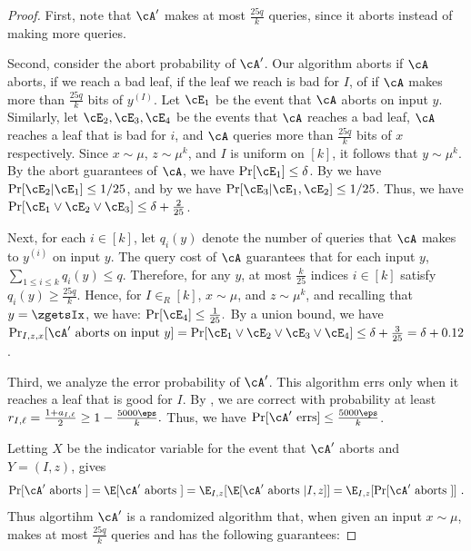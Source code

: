 \documentclass{toc}
\begin{document}
\begin{proof}
First, note that $\cA'$ makes at most $\frac{25q}{k}$ queries, since
it aborts instead of making more queries.

Second, consider the abort probability of $\cA'$.  Our algorithm
aborts if $\cA$ aborts, if we reach a bad leaf, if the leaf we reach
is bad for $I$, of if $\cA$ makes more than $\frac{25q}{k}$ bits of
$y^{(I)}$.  Let $\cE_1$ be the event that $\cA$ aborts on input $y$.
Similarly, let $\cE_2,\cE_3,\cE_4$ be the events that $\cA$ reaches a
bad leaf, $\cA$ reaches a leaf that is bad for $i$, and $\cA$ queries
more than $\frac{25q}{k}$ bits of $x$ respectively.  Since
$x\sim \mu$, $z \sim \mu^k$, and $I$ is uniform on $[k]$, it follows
that $y\sim \mu^k$.  By the abort guarantees of $\cA$, we have
$\Pr[\cE_1] \leq \delta$.  By  we have
$\Pr[\cE_2 | \cE_1] \leq 1/25$, and by 
we have $\Pr[\cE_3 | \cE_1,\cE_2] \leq 1/25$.  Thus, we have
$\Pr[\cE_1\vee \cE_2 \vee \cE_3] \leq \delta +\frac{2}{25}$.


Next, for each $i \in [k]$, let $q_i(y)$ denote the number of queries
that $\cA$ makes to $y^{(i)}$ on input $y$.  The query cost of $\cA$
guarantees that for each input $y$,
$\sum_{1\leq i\leq k} q_i(y) \leq q$.  Therefore, for any $y$, at most
$\frac{k}{25}$ indices $i\in [k]$ satisfy $q_i(y) \geq \frac{25q}{k}$.
Hence, for $I \in_R [k]$, $x\sim \mu$, and $z \sim \mu^k$, and
recalling that $y = \zgetsIx$, we have:
$\Pr[\cE_4] \leq \frac{1}{25}.$ By a union bound, we have
$\Pr_{I,z,x}[\cA' \text{ aborts on input } y] = \Pr[\cE_1 \vee \cE_2
\vee \cE_3 \vee \cE_4] \leq \delta + \frac{3}{25}=
\delta+0.12$.

Third, we analyze the error probability of $\cA'$.  This algorithm
errs only when it reaches a leaf that is good for $I$.  By
, we are correct with probability at
least
$r_{I,\ell} = \frac{1+a_{I,\ell}}{2} \geq 1-\frac{5000\eps}{k}.$
Thus, we have $\Pr[\cA' \text{ errs}] \leq \frac{5000\eps}{k}$.

%
Letting $X$ be the indicator variable for the event that $\cA'$ aborts
and $Y = (I,z)$,  gives
$$\Pr[\cA' \text{ aborts }] = \E[\cA' \text{ aborts }] =
\E_{I,z}[\E[\cA' \text{ aborts } | I,z]] = \E_{I,z}[\Pr[\cA' \text{
  aborts }]]\ .$$ Thus algortihm $\cA'$ is a randomized algorithm
that, when given an input $x \sim \mu$, makes at most $\frac{25q}{k}$
queries and has the following guarantees:


\end{proof}
\end{document}
